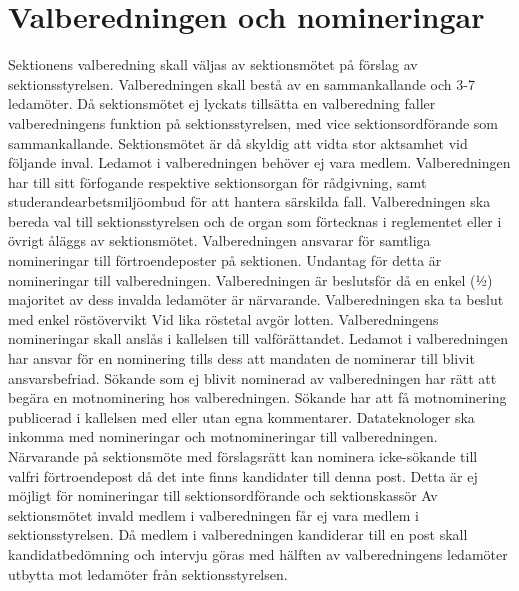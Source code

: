 \documentclass[a4paper]{dteklag}
\begin{document}
\section{Valberedningen och nomineringar}
\para Sektionens valberedning skall väljas av sektionsmötet på förslag av sektionsstyrelsen.
\para Valberedningen skall bestå av en sammankallande och 3-7 ledamöter.
\para Då sektionsmötet ej lyckats tillsätta en valberedning faller valberedningens funktion på sektionsstyrelsen, med vice sektionsordförande som sammankallande.
\stycke Sektionsmötet är då skyldig att vidta stor aktsamhet vid följande inval.
\para Ledamot i valberedningen behöver ej vara medlem.
\para Valberedningen har till sitt förfogande respektive sektionsorgan för rådgivning, samt studerandearbetsmiljöombud för att hantera särskilda fall.
\para Valberedningen ska bereda val till sektionsstyrelsen och de organ som förtecknas i reglementet eller i övrigt åläggs av sektionsmötet.
\para Valberedningen ansvarar för samtliga nomineringar till förtroendeposter på sektionen.
\stycke Undantag för detta är nomineringar till valberedningen.
\para [Sammanträden] Valberedningen är beslutsför då en enkel (1⁄2) majoritet av dess invalda ledamöter är närvarande.
\para Valberedningen ska ta beslut med enkel röstövervikt
\stycke Vid lika röstetal avgör lotten.
\para Valberedningens nomineringar skall anslås i kallelsen till valförättandet.
\para Ledamot i valberedningen har ansvar för en nominering tills dess att mandaten de nominerar till blivit ansvarsbefriad.
\para[Motnominering] Sökande som ej blivit nominerad av valberedningen har rätt att begära en motnominering hos valberedningen.
\para Sökande har att få motnominering publicerad i kallelsen med eller utan egna kommentarer.
 Datateknologer ska inkomma med nomineringar och motnomineringar till valberedningen.
\para Närvarande på sektionsmöte med förslagsrätt kan nominera icke-sökande till valfri förtroendepost då det inte finns kandidater till denna post.
\stycke Detta är ej möjligt för nomineringar till sektionsordförande och sektionskassör
\para[Jäv] Av sektionsmötet invald medlem i valberedningen får ej vara medlem i sektionsstyrelsen.
\para Då medlem i valberedningen kandiderar till en post skall kandidatbedömning och intervju göras med hälften av valberedningens ledamöter utbytta mot ledamöter från sektionsstyrelsen.  
\end{document}
